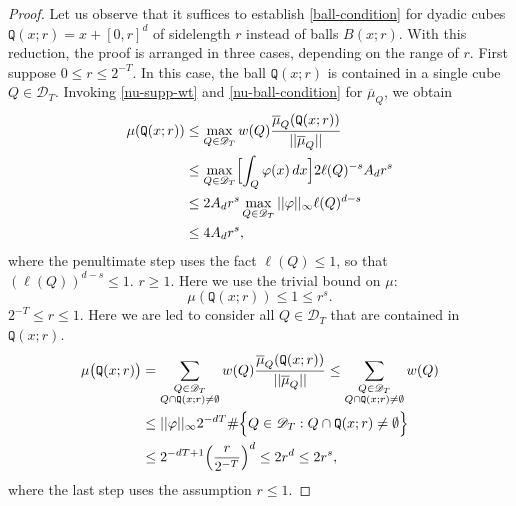 \documentclass[a4paper,11pt]{amsart}
\numberwithin{equation}{section}
\begin{document}
\begin{proof} 
Let us observe that it suffices to establish \eqref{ball-condition} for dyadic cubes $\mathtt Q(x;r) = x + [0,r]^d$ of sidelength $r$ instead of balls $B(x;r)$. With this reduction, the proof is arranged in three cases, depending on the range of $r$. 
\vskip0.1in 
 First suppose $0 \leq r \leq 2^{-T}$. In this case, the ball $\mathtt Q(x;r)$ is contained in a single cube $Q \in \mathscr{D}_T$. Invoking \eqref{nu-supp-wt} and \eqref{nu-ball-condition} for $\overline{\mu}_Q$, we obtain  
\begin{align*} 
\mu(\mathtt Q(x;r)) &\leq \max_{Q \in \mathscr{D}_T} w(Q) \frac{\overline{\mu}_Q(\mathtt Q(x;r))}{||\overline{\mu}_Q||} \\ 
&\leq \max_{Q \in \mathscr{D}_T} \Bigl[ \int_{Q} \varphi(x) \, dx \Bigr]  2 \ell(Q)^{-s} A_d r^s \\ 
&\leq 2 A_d r^s \max_{Q \in \mathscr{D}_T} ||\varphi||_{\infty} \ell(Q)^{d-s} \\ 
&\leq 4 A_d r^{s}, 
\end{align*} 
where the penultimate step uses the fact $\ell(Q) \leq 1$, so that $(\ell(Q))^{d-s} \leq 1$. 
\vskip0.1in
 $r \geq 1$. Here we use the trivial bound on $\mu$:
\[ \mu(\mathtt Q(x;r)) \leq 1 \leq  r^s. \]
\vskip0.1in
 $2^{-T} \leq r \leq 1$. Here we are led to consider all $Q \in \mathscr{D}_T$ that are contained in $\mathtt Q(x;r)$.
\begin{align*}
\mu \bigl(\mathtt Q(x;r) \bigr) &= \sum_{\begin{subarray}{c}Q \in \mathscr{D}_T \\ Q \cap \mathtt Q(x; r) \ne \emptyset \end{subarray}} w(Q) \frac{\overline{\mu}_Q(\mathtt Q(x;r))}{||\overline{\mu}_Q||} \leq  \sum_{\begin{subarray}{c}Q \in \mathscr{D}_T \\ Q \cap \mathtt Q(x; r) \ne \emptyset \end{subarray}} w(Q) \\ 
&\leq ||\varphi||_{\infty} 2^{-dT} \# \Bigl\{Q \in \mathscr{D}_T: Q \cap \mathtt Q(x;r) \ne \emptyset \Bigr\} \\ 
&\leq  2^{-dT+1}  \Bigl(\frac{r}{2^{-T}} \Bigr)^d
\leq 2 {r^d} \leq 2r^s, 
\end{align*}  
where the last step uses the assumption $r \leq 1$. 
\end{proof} 
\end{document}
